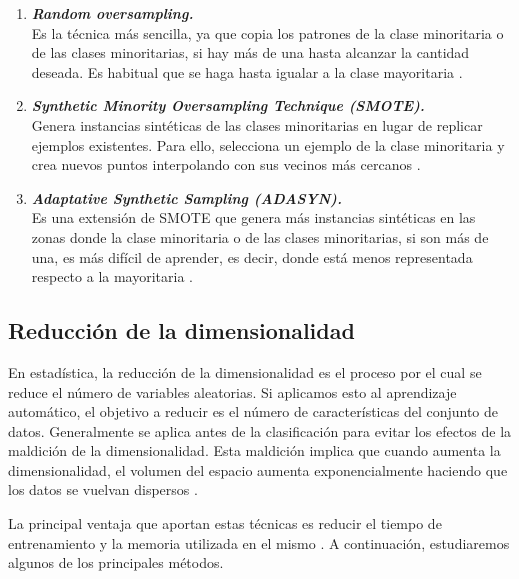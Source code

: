 \begin{enumerate}
	\item \textbf{\textit{Random oversampling.}} \\
		Es la técnica más sencilla, ya que copia los patrones de la clase minoritaria o de las clases minoritarias, si hay más de una hasta alcanzar la cantidad deseada. Es habitual que se haga hasta igualar a la clase mayoritaria \cite{resamplig}.
	\item \textbf{\textit{Synthetic Minority Oversampling Technique (SMOTE).}} \\
		Genera instancias sintéticas de las clases minoritarias en lugar de replicar ejemplos existentes. Para ello, selecciona un ejemplo de la clase minoritaria y crea nuevos puntos interpolando con sus vecinos más cercanos \cite{ELREEDY201932}.
	\item \textbf{\textit{Adaptative Synthetic Sampling (ADASYN).}} \\
		Es una extensión de SMOTE que genera más instancias sintéticas en las zonas donde la clase minoritaria o de las clases minoritarias, si son más de una, es más difícil de aprender, es decir, donde está menos representada respecto a la mayoritaria \cite{ADASYN}.
\end{enumerate}

\subsection{Reducción de la dimensionalidad}
\label{subsec:red_dim}

En estadística, la reducción de la dimensionalidad es el proceso por el cual se reduce el número de variables aleatorias. Si aplicamos esto al aprendizaje automático, el objetivo a reducir es el número de características del conjunto de datos. Generalmente se aplica antes de la clasificación para evitar los efectos de la maldición de la dimensionalidad. Esta maldición implica que cuando aumenta la dimensionalidad, el volumen del espacio aumenta exponencialmente haciendo que los datos se vuelvan dispersos \cite{maldicion}.

\newpage
La principal ventaja que aportan estas técnicas es reducir el tiempo de entrenamiento y la memoria utilizada en el mismo \cite{reddim}. A continuación, estudiaremos algunos de los principales métodos.

